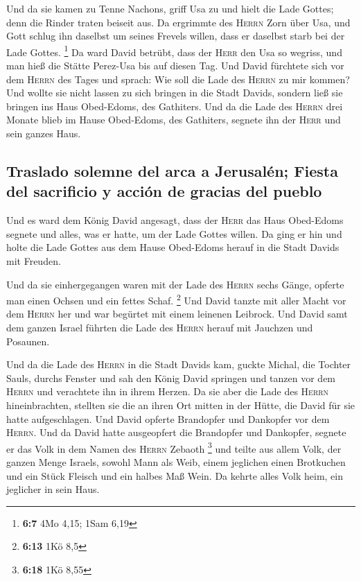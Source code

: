  Und da sie kamen zu Tenne Nachons, griff Usa zu und hielt
die Lade Gottes; denn die Rinder traten beiseit aus.  Da
ergrimmte des \textsc{Herrn} Zorn über Usa, und Gott schlug ihn daselbst
um seines Frevels willen, dass er daselbst starb bei der Lade Gottes.
\footnote{\textbf{6:7} 4Mo 4,15; 1Sam 6,19}  Da ward David
betrübt, dass der \textsc{Herr} den Usa so wegriss, und man hieß die
Stätte Perez-Usa bis auf diesen Tag.  Und David fürchtete
sich vor dem \textsc{Herrn} des Tages und sprach: Wie soll die Lade des
\textsc{Herrn} zu mir kommen?  Und wollte sie nicht
lassen zu sich bringen in die Stadt Davids, sondern ließ sie bringen ins
Haus Obed-Edoms, des Gathiters.  Und da die Lade des
\textsc{Herrn} drei Monate blieb im Hause Obed-Edoms, des Gathiters,
segnete ihn der \textsc{Herr} und sein ganzes Haus.

\hypertarget{traslado-solemne-del-arca-a-jerusaluxe9n-fiesta-del-sacrificio-y-acciuxf3n-de-gracias-del-pueblo}{%
\subsection{Traslado solemne del arca a Jerusalén; Fiesta del sacrificio
y acción de gracias del
pueblo}\label{traslado-solemne-del-arca-a-jerusaluxe9n-fiesta-del-sacrificio-y-acciuxf3n-de-gracias-del-pueblo}}

 Und es ward dem König David angesagt, dass der
\textsc{Herr} das Haus Obed-Edoms segnete und alles, was er hatte, um
der Lade Gottes willen. Da ging er hin und holte die Lade Gottes aus dem
Hause Obed-Edoms herauf in die Stadt Davids mit Freuden.

 Und da sie einhergegangen waren mit der Lade des
\textsc{Herrn} sechs Gänge, opferte man einen Ochsen und ein fettes
Schaf. \footnote{\textbf{6:13} 1Kö 8,5}  Und David tanzte
mit aller Macht vor dem \textsc{Herrn} her und war begürtet mit einem
leinenen Leibrock.  Und David samt dem ganzen Israel
führten die Lade des \textsc{Herrn} herauf mit Jauchzen und Posaunen.

 Und da die Lade des \textsc{Herrn} in die Stadt Davids
kam, guckte Michal, die Tochter Sauls, durchs Fenster und sah den König
David springen und tanzen vor dem \textsc{Herrn} und verachtete ihn in
ihrem Herzen.  Da sie aber die Lade des \textsc{Herrn}
hineinbrachten, stellten sie die an ihren Ort mitten in der Hütte, die
David für sie hatte aufgeschlagen. Und David opferte Brandopfer und
Dankopfer vor dem \textsc{Herrn}.  Und da David hatte
ausgeopfert die Brandopfer und Dankopfer, segnete er das Volk in dem
Namen des \textsc{Herrn} Zebaoth \footnote{\textbf{6:18} 1Kö 8,55}
 und teilte aus allem Volk, der ganzen Menge Israels,
sowohl Mann als Weib, einem jeglichen einen Brotkuchen und ein Stück
Fleisch und ein halbes Maß Wein. Da kehrte alles Volk heim, ein
jeglicher in sein Haus.

